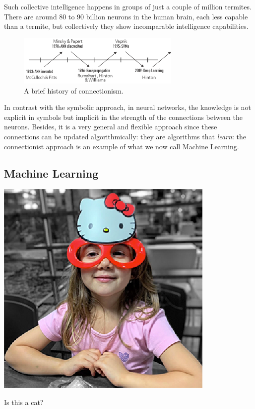 \documentclass[
  letterpaper,
  12pt,
  british]{tufte-book}
\theoremstyle{plain}
\theoremstyle{plain}
\theoremstyle{definition}
\theoremstyle{remark}
\begin{document}
Such collective intelligence happens in groups of just a couple of
million termites. There are around 80 to 90 billion neurons in the human
brain, each less capable than a termite, but collectively they show
incomparable intelligence capabilities.

\begin{figure}

{\centering \includegraphics[width=0.7\textwidth,height=\textheight]{Images/winters.png}

}

\caption{A brief history of connectionism.}

\end{figure}

In contrast with the symbolic approach, in neural networks, the
knowledge is not explicit in symbols but implicit in the strength of the
connections between the neurons. Besides, it is a very general and
flexible approach since these connections can be updated
algorithmically: they are algorithms that \emph{learn}: the
connectionist approach is an example of what we now call Machine
Learning.

\hypertarget{machine-learning}{%
\subsection{Machine Learning}\label{machine-learning}}

\begin{marginfigure}

{\centering \includegraphics{Images/lulu.png}

}

\caption{\label{fig-lulu}Is this a cat?}

\end{marginfigure}
\end{document}
